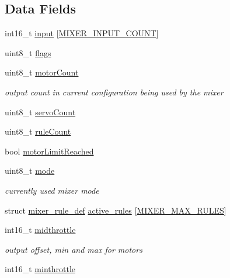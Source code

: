 \subsection*{Data Fields}
\begin{DoxyCompactItemize}
\item 
int16\+\_\+t \hyperlink{structmixer_ad0374931c43851cc52e2151ae2fe9c66}{input} \mbox{[}\hyperlink{config_2mixer_8h_a0d4a27769492fd12822190587e6b482aa085a8bfd9231937dbff417dd524f350c}{M\+I\+X\+E\+R\+\_\+\+I\+N\+P\+U\+T\+\_\+\+C\+O\+U\+N\+T}\mbox{]}
\item 
uint8\+\_\+t \hyperlink{structmixer_af3195e3b81f70f7a95ba822997217521}{flags}
\item 
uint8\+\_\+t \hyperlink{structmixer_afc295dd897528506ed9e412ce1f9966e}{motor\+Count}
\begin{DoxyCompactList}\small\item\em output count in current configuration being used by the mixer \end{DoxyCompactList}\item 
uint8\+\_\+t \hyperlink{structmixer_a1e137d87ca55446d811ad03975e36075}{servo\+Count}
\item 
uint8\+\_\+t \hyperlink{structmixer_abb2cbecb797db369a394819c2a43f08f}{rule\+Count}
\item 
bool \hyperlink{structmixer_a83c6e89ff4cb6f7d3a90f02f1e93e95a}{motor\+Limit\+Reached}
\item 
uint8\+\_\+t \hyperlink{structmixer_a5084dbc956f4788f1fb4d6af606548a1}{mode}
\begin{DoxyCompactList}\small\item\em currently used mixer mode \end{DoxyCompactList}\item 
struct \hyperlink{structmixer__rule__def}{mixer\+\_\+rule\+\_\+def} \hyperlink{structmixer_ac583adcc783a10244b5fd4e2d85f2fac}{active\+\_\+rules} \mbox{[}\hyperlink{config_2mixer_8h_ad2d3d1183e486a6464565563724e33a5}{M\+I\+X\+E\+R\+\_\+\+M\+A\+X\+\_\+\+R\+U\+L\+E\+S}\mbox{]}
\item 
int16\+\_\+t \hyperlink{structmixer_a3c6787d15c669ebad71e3f60bbc64cec}{midthrottle}
\begin{DoxyCompactList}\small\item\em output offset, min and max for motors \end{DoxyCompactList}\item 
int16\+\_\+t \hyperlink{structmixer_ab268773664c6d4abe3b4e12c0477d879}{minthrottle}
\item 

\end{DoxyCompactItemize}

